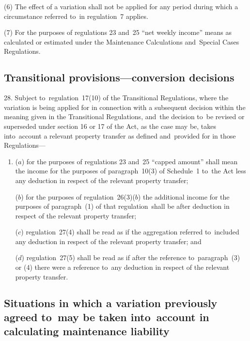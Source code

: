 \documentclass[12pt,a4paper]{article}
\begin{document}
(6) The effect of a variation shall not be applied for any period during which a circumstance referred to~in regulation~7 applies.

(7) For the purposes of regulations 23 and~25 “net weekly income” means as calculated or estimated under the Maintenance Calculations and~Special Cases Regulations.

\vfill


\subsection[28. Transitional provisions—conversion decisions]{Transitional provisions—conversion decisions}

28.  
Subject to~regulation~17(10) of the Transitional Regulations, where  %
the variation is being applied for in connection with a subsequent decision within the meaning given in the Transitional Regulations, and~the decision to~be revised or superseded under section 16 or 17 of the Act, as the case may be, takes into~account a relevant property transfer as defined and~provided for in those Regulations—
\begin{enumerate}\item[]
($a$) for the purposes of regulations 23 and~25 “capped amount” shall mean the income for the purposes of paragraph~10(3) of Schedule~1 to~the Act less any deduction in respect of the relevant property transfer;

($b$) for the purposes of regulation~26(3)($b$)  the additional income for the purposes of paragraph~(1) of that regulation~shall be after deduction in respect of the relevant property transfer;

($c$) regulation~27(4) shall be read as if the aggregation referred to~included any deduction in respect of the relevant property transfer; and

($d$) regulation~27(5) shall be read as if after the reference to~paragraph~(3) or (4) there were a reference to~any deduction in respect of the relevant property transfer.
\end{enumerate}


\subsection[29. Situations in which a variation previously agreed to~may be taken into~account in calculating maintenance liability]{Situations in which a variation previously agreed to~may be taken into~account in calculating maintenance liability}
\end{document}
